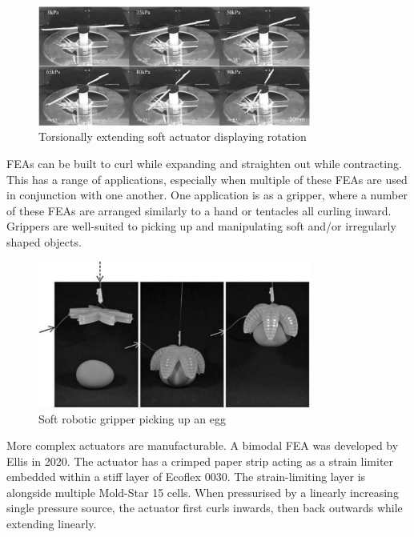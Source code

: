 \begin{figure}[H]
	\centering
	\includegraphics[width=0.8\textwidth]{TorsionalExtension.png}
	\caption{Torsionally extending soft actuator displaying rotation \citep{Yan2018}}
	\label{fig:tea}
\end{figure}

FEAs can be built to curl while expanding and straighten out while contracting. This has a range of applications, especially when multiple of these FEAs are used in conjunction with one another. One application is as a gripper, where a number of these FEAs are arranged similarly to a hand or tentacles all curling inward. Grippers are well-suited to picking up and manipulating soft and/or irregularly shaped objects. \citep{Ilievski2011}

\begin{figure}[H]
	\centering
	\includegraphics[width=0.8\textwidth]{Gripper.png}
	\caption{Soft robotic gripper picking up an egg \citep{Ilievski2011}}
	\label{fig:grip}
\end{figure}

More complex actuators are manufacturable. A bimodal FEA was developed by Ellis in 2020. The actuator has a crimped paper strip acting as a strain limiter embedded within a stiff layer of Ecoflex 0030. The strain-limiting layer is alongside multiple Mold-Star 15 cells. When pressurised by a linearly increasing single pressure source, the actuator  first curls inwards, then back outwards while extending linearly. \citep{Ellis2020}

